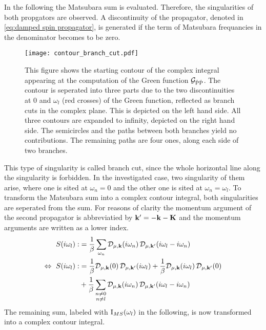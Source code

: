 %
In the following the Matsubara sum is evaluated.
Therefore, the singularities of both propgators are observed.
A discontinuity of the propagator, denoted in \eqref{eq:damped spin propagator}, is generated if the term of Matsubara frequancies in the denominator becomes to be zero.
%
\begin{figure}[t]
	\centering
	\texttt{[image: contour\_branch\_cut.pdf]}
	\caption{
This figure shows the starting contour of the complex integral appearing at the computation of the Green function $\mathcal{G}_{\dot{\mathrm{P}}\dot{\mathrm{P}}}$.
The contour is seperated into three parts due to the two discontinuities at $0$ and $\omega_{l}$ (red crosses) of the Green function, reflected as branch cuts in the complex plane.
This is depicted on the left hand side.
All three contours are expanded to infinity, depicted on the right hand side.
The semicircles and the paths between both branches yield no contributions.
The remaining paths are four ones, along each side of two branches.
	}
	\label{fig:contour branch cut}
\end{figure}
%
This type of singularity is called branch cut, since the whole horizontal line along the singularity is forbidden.
In the investigated case, two singularity of them arise, where one is sited at $\omega_{n} = 0$ and the other one is sited at $\omega_{n} = \omega_{l}$.
To transform the Matsubara sum into a complex contour integral, both singularities are seperated from the sum.
For reasons of clarity the momentum argument of the second propagator is abbreviatied by $\vb{k}'=-\vb{k}-\vb{K}$ and the momentum arguments are written as a lower index.
%
\begin{align}
	S(i\omega_{l}) :&= \frac{1}{\beta} \sum\limits_{\omega_{n}} \mathcal{D}_{\mu,\vb{k}}(i\omega_{n}) \, \mathcal{D}_{\mu,\vb{k}'}(i\omega_{l}-i\omega_{n})
	\notag \\
	\Leftrightarrow\ S(i\omega_{l}) :&= 
		\frac{1}{\beta} \mathcal{D}_{\mu,\vb{k}}(0) \, \mathcal{D}_{\mu,\vb{k}'}(i\omega_{l})
		+
		\frac{1}{\beta} \mathcal{D}_{\mu,\vb{k}}(i\omega_{l}) \, \mathcal{D}_{\mu,\vb{k}'}(0)
		\notag \\
		&+
		\frac{1}{\beta} \sum\limits_{\substack{n \neq 0 \\ n \neq l}} \mathcal{D}_{\mu,\vb{k}}(i\omega_{n}) \, \mathcal{D}_{\mu,\vb{k}'}(i\omega_{l}-i\omega_{n})
	\label{appeq:seperated Matsubara sum}
\end{align}
%
The remaining sum, labeled with $\mathrm{I}_{MS}(\omega_{l})$ in the following, is now transformed into a complex contour integral.
